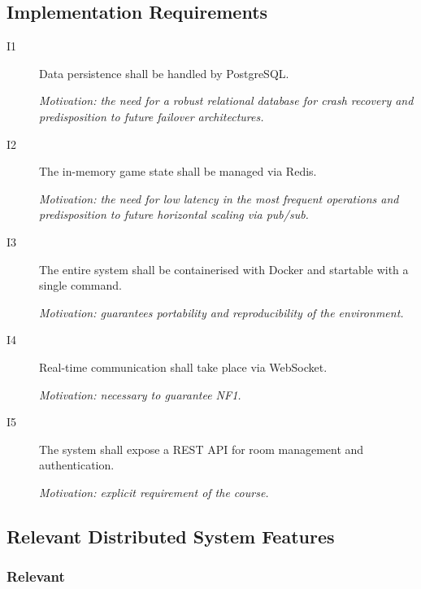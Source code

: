 \documentclass{scrartcl}
\begin{document}
\subsection{Implementation Requirements}

\begin{description}
  \item[I1] Data persistence shall be handled by PostgreSQL.

  \textit{Motivation: the need for a robust relational database for crash recovery and predisposition to future failover architectures.}

  \item[I2] The in-memory game state shall be managed via Redis.

  \textit{Motivation: the need for low latency in the most frequent operations and predisposition to future horizontal scaling via pub/sub.}

  \item[I3] The entire system shall be containerised with Docker and startable with a single command.

  \textit{Motivation: guarantees portability and reproducibility of the environment.}

  \item[I4] Real-time communication shall take place via WebSocket.

  \textit{Motivation: necessary to guarantee NF1.}

  \item[I5] The system shall expose a REST API for room management and authentication.

  \textit{Motivation: explicit requirement of the course.}

\end{description}


\subsection{Relevant Distributed System Features}
\label{ds-features}

\subsubsection*{Relevant}
\end{document}
